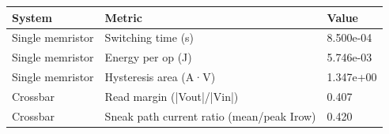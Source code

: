 \begin{tabular}{lll}
\hline
System & Metric & Value \\
\hline
Single memristor & Switching time (s) & 8.500e-04 \\
Single memristor & Energy per op (J) & 5.746e-03 \\
Single memristor & Hysteresis area (A·V) & 1.347e+00 \\
Crossbar & Read margin (|Vout|/|Vin|) & 0.407 \\
Crossbar & Sneak path current ratio (mean/peak Irow) & 0.420 \\
\hline
\end{tabular}
